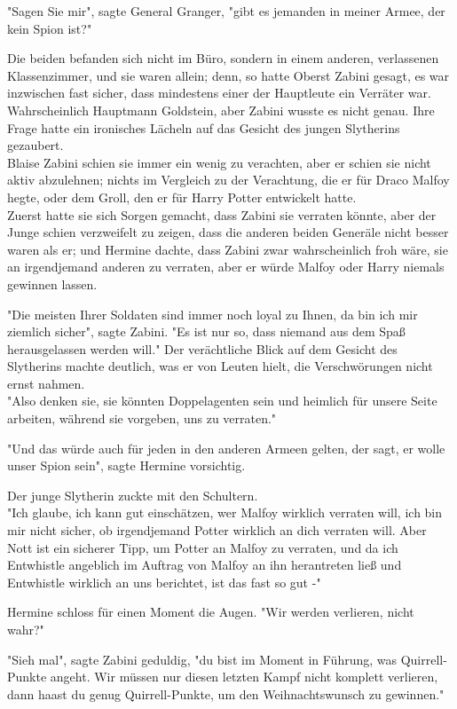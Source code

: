 {"Sagen Sie mir", sagte General Granger, "gibt es jemanden in meiner Armee, der kein Spion ist?"

Die beiden befanden sich nicht im Büro, sondern in einem anderen, verlassenen Klassenzimmer, und sie waren allein; denn, so hatte Oberst Zabini gesagt, es war inzwischen fast sicher, dass mindestens einer der Hauptleute ein Verräter war.\\ Wahrscheinlich Hauptmann Goldstein, aber Zabini wusste es nicht genau. Ihre Frage hatte ein ironisches Lächeln auf das Gesicht des jungen Slytherins gezaubert.\\ Blaise Zabini schien sie immer ein wenig zu verachten, aber er schien sie nicht aktiv abzulehnen; nichts im Vergleich zu der Verachtung, die er für Draco Malfoy hegte, oder dem Groll, den er für Harry Potter entwickelt hatte.\\ Zuerst hatte sie sich Sorgen gemacht, dass Zabini sie verraten könnte, aber der Junge schien verzweifelt zu zeigen, dass die anderen beiden Generäle nicht besser waren als er; und Hermine dachte, dass Zabini zwar wahrscheinlich froh wäre, sie an irgendjemand anderen zu verraten, aber er würde Malfoy oder Harry niemals gewinnen lassen.

"Die meisten Ihrer Soldaten sind immer noch loyal zu Ihnen, da bin ich mir ziemlich sicher", sagte Zabini. "Es ist nur so, dass niemand aus dem Spaß herausgelassen werden will." Der verächtliche Blick auf dem Gesicht des Slytherins machte deutlich, was er von Leuten hielt, die Verschwörungen nicht ernst nahmen.\\ "Also denken sie, sie könnten Doppelagenten sein und heimlich für unsere Seite arbeiten, während sie vorgeben, uns zu verraten."

"Und das würde auch für jeden in den anderen Armeen gelten, der sagt, er wolle unser Spion sein", sagte Hermine vorsichtig.

Der junge Slytherin zuckte mit den Schultern.\\ "Ich glaube, ich kann gut einschätzen, wer Malfoy wirklich verraten will, ich bin mir nicht sicher, ob irgendjemand Potter wirklich an dich verraten will. Aber Nott ist ein sicherer Tipp, um Potter an Malfoy zu verraten, und da ich Entwhistle angeblich im Auftrag von Malfoy an ihn herantreten ließ und Entwhistle wirklich an uns berichtet, ist das fast so gut -"

Hermine schloss für einen Moment die Augen. "Wir werden verlieren, nicht wahr?"

"Sieh mal", sagte Zabini geduldig, "du bist im Moment in Führung, was Quirrell-Punkte angeht. Wir müssen nur diesen letzten Kampf nicht komplett verlieren, dann haast du genug Quirrell-Punkte, um den Weihnachtswunsch zu gewinnen."

}
